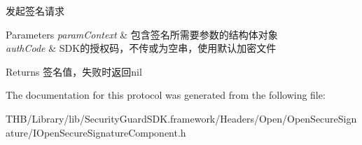 发起签名请求


\begin{DoxyParams}{Parameters}
{\em param\+Context} & 包含签名所需要参数的结构体对象\\
\hline
{\em auth\+Code} & S\+D\+K的授权码，不传或为空串，使用默认加密文件\\
\hline
\end{DoxyParams}
\begin{DoxyReturn}{Returns}
签名值，失败时返回nil 
\end{DoxyReturn}


The documentation for this protocol was generated from the following file\+:\begin{DoxyCompactItemize}
\item 
T\+H\+B/\+Library/lib/\+Security\+Guard\+S\+D\+K.\+framework/\+Headers/\+Open/\+Open\+Secure\+Signature/I\+Open\+Secure\+Signature\+Component.\+h\end{DoxyCompactItemize}
